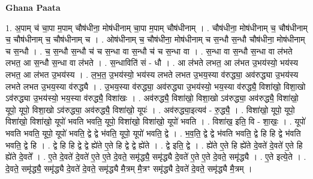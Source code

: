 \documentclass[17pt]{extarticle}
\begin{document}
\textbf{Ghana Paata } \newline

1. अ॒पाम् च॑ चा॒पा म॒पाम् चौष॑धीना॒ मोष॑धीनाम् चा॒पा म॒पाम् चौष॑धीनाम् । . चौष॑धीना॒ मोष॑धीनाम् च॒ चौष॑धीनाम् च॒ चौष॑धीनाम् च॒ चौष॑धीनाम् च । . ओष॑धीनाम् च॒ चौष॑धीना॒ मोष॑धीनाम् च स॒न्धौ स॒न्धौ चौष॑धीना॒ मोष॑धीनाम् च स॒न्धौ । . च॒ स॒न्धौ स॒न्धौ च॑ च स॒न्धा वा स॒न्धौ च॑ च स॒न्धा वा । . स॒न्धा वा स॒न्धौ स॒न्धा वा ल॑भते लभत॒ आ स॒न्धौ स॒न्धा वा ल॑भते । . स॒न्धाविति॑ सं - धौ । . आ ल॑भते लभत॒ आ ल॑भत उ॒भय॑स्यो॒ भय॑स्य लभत॒ आ ल॑भत उ॒भय॑स्य । . ल॒भ॒त॒ उ॒भय॑स्यो॒ भय॑स्य लभते लभत उ॒भय॒स्या व॑रुद्ध्या॒ अव॑रुद्ध्या उ॒भय॑स्य लभते लभत उ॒भय॒स्या व॑रुद्ध्यै । . उ॒भय॒स्या व॑रुद्ध्या॒ अव॑रुद्ध्या उ॒भय॑स्यो॒ भय॒स्या व॑रुद्ध्यै॒ विशा॑खो॒ विशा॒खो ऽव॑रुद्ध्या उ॒भय॑स्यो॒ भय॒स्या व॑रुद्ध्यै॒ विशा॑खः । . अव॑रुद्ध्यै॒ विशा॑खो॒ विशा॒खो ऽव॑रुद्ध्या॒ अव॑रुद्ध्यै॒ विशा॑खो॒ यूपो॒ यूपो॒ विशा॒खो ऽव॑रुद्ध्या॒ अव॑रुद्ध्यै॒ विशा॑खो॒ यूपः॑ । . अव॑रुद्ध्या॒इत्यव॑ - रु॒द्ध्यै॒ । . विशा॑खो॒ यूपो॒ यूपो॒ विशा॑खो॒ विशा॑खो॒ यूपो॑ भवति भवति॒ यूपो॒ विशा॑खो॒ विशा॑खो॒ यूपो॑ भवति । . विशा॑ख॒ इति॒ वि - शा॒खः॒ । . यूपो॑ भवति भवति॒ यूपो॒ यूपो॑ भवति॒ द्वे द्वे भ॑वति॒ यूपो॒ यूपो॑ भवति॒ द्वे । . भ॒व॒ति॒ द्वे द्वे भ॑वति भवति॒ द्वे हि हि द्वे भ॑वति भवति॒ द्वे हि । . द्वे हि हि द्वे द्वे ह्ये॑ते ए॒ते हि द्वे द्वे ह्ये॑ते । . द्वे इति॒ द्वे । . ह्ये॑ते ए॒ते हि ह्ये॑ते दे॒वते॑ दे॒वते॑ ए॒ते हि ह्ये॑ते दे॒वते᳚ । . ए॒ते दे॒वते॑ दे॒वते॑ ए॒ते ए॒ते दे॒वते॒ समृ॑द्ध्यै॒ समृ॑द्ध्यै दे॒वते॑ ए॒ते ए॒ते दे॒वते॒ समृ॑द्ध्यै । . ए॒ते इत्ये॒ते । . दे॒वते॒ समृ॑द्ध्यै॒ समृ॑द्ध्यै दे॒वते॑ दे॒वते॒ समृ॑द्ध्यै मै॒त्रम् मै॒त्रꣳ समृ॑द्ध्यै दे॒वते॑ दे॒वते॒ समृ॑द्ध्यै मै॒त्रम् । \newline
\end{document}
